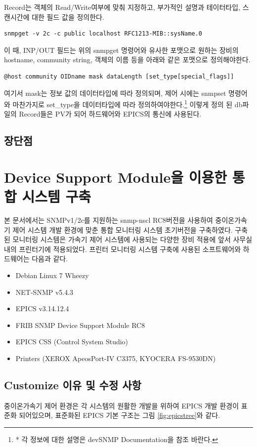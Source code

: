 \documentclass[11pt
  , a4paper
  , article
  , oneside
]{memoir}
\begin{document}
Record는 객체의 Read/Write여부에 맞춰 지정하고, 부가적인 설명과 테이터타입, 스캔시간에 대한 필드 값을 정의한다. 

\begin{lstlisting}[style=termstyle]
snmpget -v 2c -c public localhost RFC1213-MIB::sysName.0
\end{lstlisting}

이 때, INP/OUT 필드는 위의 snmpget 명령어와 유사한 포맷으로 원하는 장비의 hostname, community string, 객체의 이름 등을 아래와 같은 포맷으로 정의해야한다. 
\begin{lstlisting}[style=termstyle]
@host community OIDname mask dataLength [set_type[special_flags]]
\end{lstlisting}
여기서 mask는 정보 값의 데이터타입에 따라 정의되며, 제어 시에는 snmpset 명령어와 마찬가지로 set\_type을 데이터타입에 따라 정의하여야한다.\footnote{* 각 정보에 대한 설명은 devSNMP Documentation을 참조 바란다.} 이렇게 정의 된 db파일의 Record들은 PV가 되어 하드웨어와 EPICS의 통신에 사용된다.

\subsection{장단점}




\clearpage

\section{Device Support Module을 이용한 통합 시스템 구축}
본 문서에서는 SNMPv1/2c를 지원하는 snmp-nscl RC8버전을 사용하여 중이온가속기 제어 시스템 개발 환경에 맞춘 통합 모니터링 시스템 초기버전을 구축하였다. 구축된 모니터링 시스템은 가속기 제어 시스템에 사용되는 다양한 장비 적용에 앞서 사무실 내의 프린터기에 적용되었다. 프린터 모니터링 시스템 구축에 사용된 소프트웨어와 하드웨어는 다음과 같다.

\begin{itemize}
\item Debian Linux 7 Wheezy
\item NET-SNMP v5.4.3
\item EPICS v3.14.12.4
\item FRIB SNMP Device Support Module RC8
\item EPICS CSS (Control System Studio)
\item Printers (XEROX ApeosPort-IV C3375, KYOCERA FS-9530DN)
\end{itemize}

\subsection{Customize 이유 및 수정 사항}
중이온가속기 제어 환경은 각 시스템의 원활한 개발을 위하여 EPICS 개발 환경이 표준화 되어있으며\citep{epicsev}, 표준화된 EPICS 기본 구조는 그림 \ref{fig:epicstree}와 같다.
\end{document}
